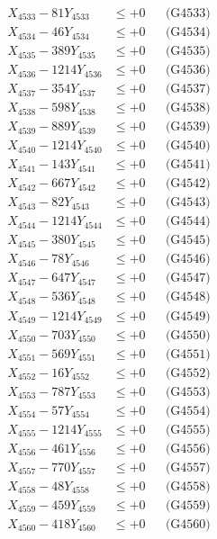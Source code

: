 \documentclass[a4paper,10pt]{article}
\begin{document}
{\begin{align}
X_{4533} - 81Y_{4533} &\leq +0 && \text{(G4533)} \\
X_{4534} - 46Y_{4534} &\leq +0 && \text{(G4534)} \\
X_{4535} - 389Y_{4535} &\leq +0 && \text{(G4535)} \\
X_{4536} - 1214Y_{4536} &\leq +0 && \text{(G4536)} \\
X_{4537} - 354Y_{4537} &\leq +0 && \text{(G4537)} \\
X_{4538} - 598Y_{4538} &\leq +0 && \text{(G4538)} \\
X_{4539} - 889Y_{4539} &\leq +0 && \text{(G4539)} \\
X_{4540} - 1214Y_{4540} &\leq +0 && \text{(G4540)} \\
\allowbreak
X_{4541} - 143Y_{4541} &\leq +0 && \text{(G4541)} \\
X_{4542} - 667Y_{4542} &\leq +0 && \text{(G4542)} \\
X_{4543} - 82Y_{4543} &\leq +0 && \text{(G4543)} \\
X_{4544} - 1214Y_{4544} &\leq +0 && \text{(G4544)} \\
X_{4545} - 380Y_{4545} &\leq +0 && \text{(G4545)} \\
X_{4546} - 78Y_{4546} &\leq +0 && \text{(G4546)} \\
X_{4547} - 647Y_{4547} &\leq +0 && \text{(G4547)} \\
X_{4548} - 536Y_{4548} &\leq +0 && \text{(G4548)} \\
X_{4549} - 1214Y_{4549} &\leq +0 && \text{(G4549)} \\
X_{4550} - 703Y_{4550} &\leq +0 && \text{(G4550)} \\
\allowbreak
X_{4551} - 569Y_{4551} &\leq +0 && \text{(G4551)} \\
X_{4552} - 16Y_{4552} &\leq +0 && \text{(G4552)} \\
X_{4553} - 787Y_{4553} &\leq +0 && \text{(G4553)} \\
X_{4554} - 57Y_{4554} &\leq +0 && \text{(G4554)} \\
X_{4555} - 1214Y_{4555} &\leq +0 && \text{(G4555)} \\
X_{4556} - 461Y_{4556} &\leq +0 && \text{(G4556)} \\
X_{4557} - 770Y_{4557} &\leq +0 && \text{(G4557)} \\
X_{4558} - 48Y_{4558} &\leq +0 && \text{(G4558)} \\
X_{4559} - 459Y_{4559} &\leq +0 && \text{(G4559)} \\
X_{4560} - 418Y_{4560} &\leq +0 && \text{(G4560)} \\

\end{align}}
\end{document}
